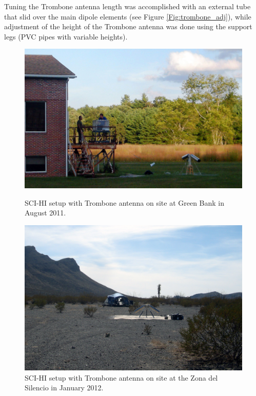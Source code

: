 Tuning the Trombone antenna length was accomplished with an external tube that slid over the main dipole elements (see Figure \ref{Fig:trombone_adj}), while adjustment of the height of the Trombone antenna was done using the support legs (PVC pipes with variable heights).

\begin{figure}[htb]
\centering
\begin{minipage}[b]{0.48\textwidth}
\centering
\includegraphics[width=0.95\linewidth]{SCIHI_system/figures/trombone_gbt.jpg}
\caption{SCI-HI setup with Trombone antenna on site at Green Bank in August 2011.}
\label{Fig:trombone_gbt}
\end{minipage}%
\begin{minipage}[b]{0.02\textwidth}
\hspace{1cm}
\end{minipage}%
\begin{minipage}[b]{0.46\textwidth}
\centering
\includegraphics[width=0.95\linewidth]{SCIHI_system/figures/trombone_sys_ZdS.jpg}
\caption{SCI-HI setup with Trombone antenna on site at the Zona del Silencio in January 2012.}
\label{Fig:trombone_zds}
\end{minipage}
\end{figure}

